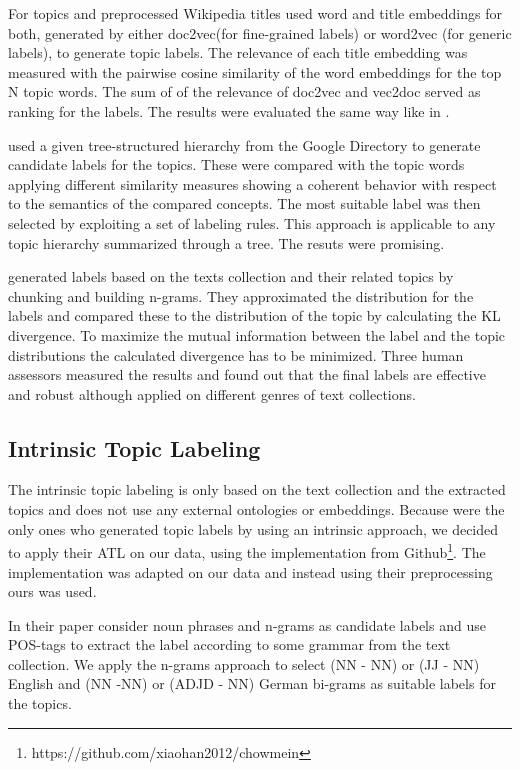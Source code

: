 For topics and preprocessed Wikipedia titles \textit{\cite{Bhatia2016}} used word and title embeddings for both, generated by either doc2vec(for fine-grained labels) or word2vec (for generic labels), to generate topic labels. The relevance of each title embedding was measured with the pairwise cosine similarity of the word embeddings for the top N topic words. The sum of of the relevance of doc2vec and vec2doc served as ranking for the labels. The results were evaluated the same way like in \cite{Lau2011}.

\textit{\cite{Magatti2009}} used a given tree-structured hierarchy from the Google Directory to generate candidate labels for the topics. These were compared with the topic words applying different similarity measures showing a coherent behavior with respect to the semantics of the compared concepts. The most suitable label was then selected by exploiting a set of labeling
rules. This approach is applicable to any topic hierarchy summarized through a tree. The resuts were promising.

\textit{\cite{Mei2007}} generated labels based on the texts collection and their related topics by chunking and building n-grams. They approximated the distribution for the labels and compared these to the distribution of the topic by calculating the \ac{KL} divergence. To maximize the mutual information between the label and the topic distributions the calculated divergence has to be minimized. Three human assessors measured the results and found out that the final labels are effective and robust although applied on different genres of text collections. 


\subsection{Intrinsic Topic Labeling}
\label{sec:intrinsic}
The intrinsic topic labeling is only based on the text collection and the extracted topics and does not use any external ontologies or embeddings. Because \textit{\cite{Mei2007}} were the only ones who generated topic labels by using an intrinsic approach, we decided to apply their \ac{ATL} on our data, using the implementation from Github\footnote{https://github.com/xiaohan2012/chowmein}. The implementation was adapted on our data and instead using their preprocessing ours was used.

In their paper \textit{\cite{Mei2007}} consider noun phrases and n-grams as candidate labels and use \ac{POS}-tags to extract the label according to some grammar from the text collection. We apply the n-grams approach to select (NN - NN) or (JJ - NN) English and (NN -NN) or (ADJD - NN) German bi-grams as suitable labels for the topics.

